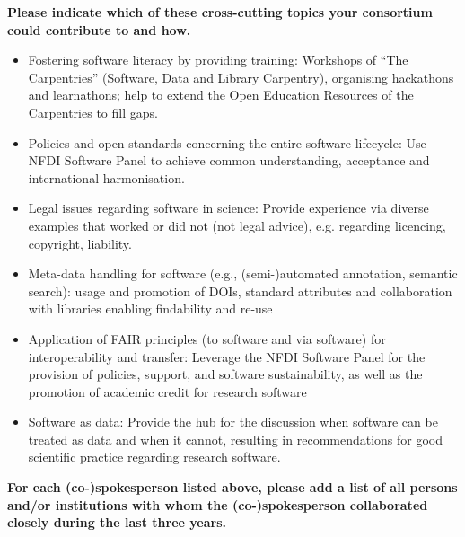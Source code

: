 \documentclass[11pt,a4paper]{scrlttr2}
\begin{document}
\begin{letter}{}
\vspace{1em}
\textbf{Please indicate which of these cross-cutting topics your consortium could contribute to and how.}\\
\begin{itemize}
 \setlength\itemsep{0em}
\item Fostering software literacy by providing training: Workshops of  “The Carpentries” (Software, Data and Library Carpentry), organising hackathons and learnathons; help to extend the Open Education Resources of the Carpentries to fill gaps.
\item Policies and open standards concerning the entire software lifecycle: Use NFDI Software Panel to achieve common understanding, acceptance and international harmonisation.
\item Legal issues regarding software in science: Provide experience via diverse examples that worked or did not (not legal advice), e.g. regarding licencing, copyright, liability.
\item Meta-data handling for software (e.g., (semi-)automated annotation, semantic search): usage and promotion of DOIs, standard attributes and collaboration with libraries enabling findability and re-use
\item Application of FAIR principles (to software and via software) for interoperability and transfer: Leverage the NFDI Software Panel for the provision of policies, support, and software sustainability, as well as the promotion of academic credit for research software
\item Software as data: Provide the hub for the discussion when software can be treated as data and when it cannot, resulting in recommendations for good scientific practice regarding research software.
\end{itemize}


\textbf{For each (co-)spokesperson listed above, please add a list of all persons and/or
institutions with whom the (co-)spokesperson collaborated closely during the last
three years.}\\


\end{letter}
\end{document}
